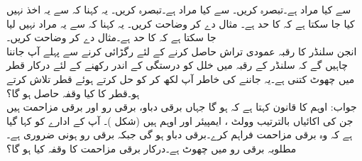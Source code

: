  سے کیا مراد ہے۔تبصرہ کریں۔
 سے کیا مراد ہے۔تبصرہ کریں۔
یہ کہنا کہ  سے یہ اخذ نہیں کیا جا سکتا ہے کہ  کا حد  ہے۔ مثال دے کر وضاحت کریں۔
یہ کہنا کہ  سے یہ مراد نہیں لیا جا سکتا ہے کہ  کا حد  ہے۔مثال دے کر وضاحت کریں۔
\\
انجن سلنڈر  کا رقبہ عمودی تراش  حاصل کرنے کے لئے رگڑائی کرنے سے پہلے آپ جاننا چاہیں گے کہ سلنڈر کے رقبہ میں خلل کو  درستگی کے اندر رکھنے کے لئے درکار  قطر  میں چھوٹ کتنی ہے۔یہ جاننے کی خاطر آپ  لکھ کر  کو حل کرتے ہوئے قطر  تلاش کرتے ہو۔قطر کا کیا وقفہ حاصل ہو گا؟\\
جواب:\quad
{}
اوہم کا قانون کہتا ہے کہ  ہو گا جہاں  برقی دباو،  برقی رو اور  برقی مزاحمت ہیں جن کی اکائیاں بالترتیب وولٹ ، ایمپیئر  اور اوہم  ہیں (شکل )۔ آپ کے ادارے کو کہا گیا ہے کہ وہ برقی مزاحمت فراہم کرے۔برقی دباو  ہو گی جبکہ برقی رو  ہونی ضروری ہے۔ مطلوبہ برقی رو  میں چھوٹ  ہے۔درکار برقی مزاحمت کا وقفہ کیا ہو گا؟
